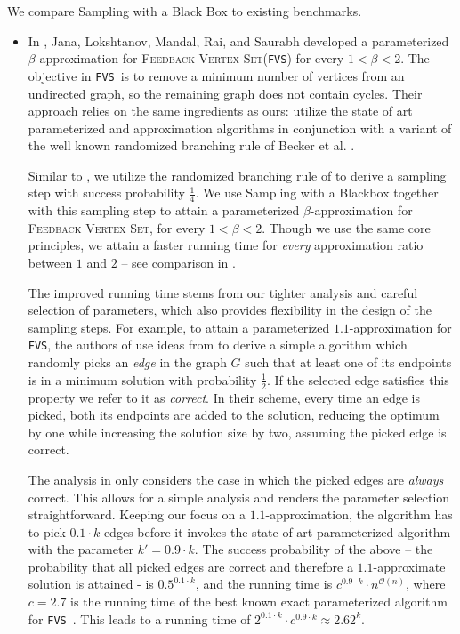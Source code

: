 \documentclass[letterpaper,11pt]{article}
\newcommand{\1}[1]{\mathds{1}\left[#1\right]}
\newcommand{\Oh}{\mathcal{O}}
\newcommand{\FVS}{\textnormal{\texttt{FVS}}\xspace}
\newcommand{\fvs}{\textsc{Feedback Vertex Set}\xspace}
\begin{document}
We compare Sampling with a Black Box to existing benchmarks. 
\begin{itemize}
	\item
	In \cite{janaParameterizedApproximationScheme2023}, Jana, Lokshtanov, Mandal,  Rai, and Saurabh developed a parameterized $\beta$-approximation for \fvs (\FVS) for every $1<\beta<2$.  The objective in \FVS\, is to remove a minimum number of vertices from an undirected graph, so the remaining graph does not contain cycles. 
	Their approach relies on the same ingredients as ours: utilize the state of art parameterized and approximation algorithms in conjunction with a variant of the well known  randomized branching rule of Becker et al. \cite{beckerRandomizedAlgorithmsLoop2000}.
	
	Similar to \cite{janaParameterizedApproximationScheme2023}, we utilize the randomized branching rule of  \cite{beckerRandomizedAlgorithmsLoop2000} to derive a sampling step with success probability $\frac{1}{4}$. We use Sampling with a Blackbox together with this sampling step to attain a parameterized $\beta$-approximation for \fvs, for every $1<\beta<2$.
	 Though we use the same core principles, we attain a faster running time for {\em every} approximation ratio between $1$ and $2$ -- see comparison in . 
	
	The improved running time stems from our tighter analysis and careful selection of parameters, which also provides flexibility in the design of the sampling steps. For example, to attain  a parameterized $1.1$-approximation for \FVS, the authors of \cite{janaParameterizedApproximationScheme2023} use ideas from \cite{beckerRandomizedAlgorithmsLoop2000} to derive a simple algorithm which randomly picks an {\em edge} in the graph $G$ such that at least one of its endpoints is in a minimum solution with probability $\frac{1}{2}$. 
	If the selected edge satisfies this property we refer to it as {\em correct}. 
	In their scheme, every time an edge is picked, both its endpoints are added to the solution, reducing the optimum by one while increasing the solution size by two, assuming the picked edge is correct.
	
	The analysis in \cite{janaParameterizedApproximationScheme2023} only considers the case in which  the picked edges  are {\em always} correct. This allows for a simple analysis and renders the parameter selection straightforward. Keeping our focus on a $1.1$-approximation,  the algorithm has to pick $0.1\cdot k$ edges before it invokes the state-of-art parameterized algorithm with the parameter $k'=0.9\cdot k$. The success probability of the above -- the probability that all picked edges are correct and therefore a $1.1$-approximate solution is attained - is $0.5^{0.1\cdot k}$, and the running time is  $c^{0.9\cdot k}\cdot n^{\Oh(n)}$,  where $c=2.7$ is the running time of the best known exact parameterized  algorithm for \FVS~\cite {liDetectingFeedbackVertex2022}. This leads to a running time of $2^{0.1\cdot k}\cdot c^{0.9\cdot k}\approx 2.62^k$.
	

\end{itemize}
\end{document}
